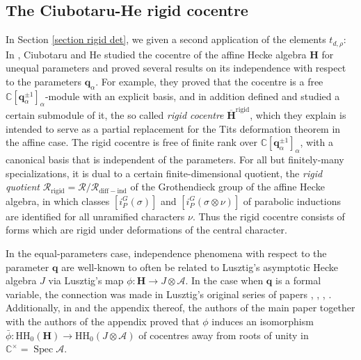 \documentclass[10pt]{article}
\DeclareMathOperator{\Spec}{Spec}
\newcommand{\HH}{\mathbf{H}}
\newcommand{\trace}[2]{\mathrm{trace}\left({#1}\,,{#2}\right)}
\newcommand{\C}{\mathbb{C}}
\newcommand{\bq}{\mathbf{q}}
\theoremstyle{definition}
\theoremstyle{remark}
\newcommand{\Hr}{\overline{\HH}^{\mathrm{rigid}}}
\newcommand{\Hrq}{\overline{H}^{\mathrm{rigid}}_q}
\newcommand{\phir}{\overline{\phi}^{\mathrm{rigid}}}
\newcommand{\Jr}{\overline{J}^{\mathrm{rigid}}}
\newcommand{\Jrs}{\overline{J}^{\mathrm{rigid}}_{\mathrm{sub}}}
\newcommand{\RH}{\mathcal{R}}
\newcommand{\RHr}{\mathcal{R}_{\mathrm{rigid}}}
\newcommand{\RHdi}{\mathcal{R}_{\mathrm{diff-ind}}}
\newcommand{\hhh}{\mathrm{HH}_0}
\begin{document}
\subsection{The Ciubotaru-He rigid cocentre}
In Section \ref{section rigid det}, we given a second application of the elements $t_{d,\rho}$:
In \cite{CH}, Ciubotaru and He studied the cocentre of the affine Hecke algebra $\HH$
for unequal parameters and proved several results on its independence with respect to the parameters 
$\bq_\alpha$. 
For example, they proved that the cocentre is a free $\C[\bq_\alpha^{\pm 1}]_\alpha$-module with an 
explicit basis, and in addition defined and studied a certain submodule of it, the so called 
\emph{rigid cocentre} $\Hr$, which they explain is intended to serve as a partial replacement for the Tits 
deformation theorem in the affine case. The rigid cocentre is free of finite rank over $\C[\bq_\alpha^{\pm 1}]_\alpha$, 
with a canonical basis that is independent of the parameters. For all but finitely-many specializations, 
it is dual to a certain finite-dimensional quotient, the \emph{rigid quotient} $\RHr=\RH/\RHdi$ of the Grothendieck 
group of the affine Hecke algebra, in which classes $[i_P^G(\sigma)]$ and 
$[i_P^G(\sigma\otimes\nu)]$ of parabolic inductions are identified for all unramified characters $\nu$. 
Thus the rigid cocentre consists of forms which are rigid under deformations of the central character. 

In the equal-parameters case, independence phenomena with respect to the parameter $\bq$ are
well-known to often be related to Lusztig's asymptotic Hecke algebra $J$ via Lusztig's map $\phi\colon\HH\to J\otimes\mathcal{A}$.
In the case when $\bq$ is a formal variable, the connection was made in Lusztig's original series 
of papers \cite{cellsI}, \cite{cellsII}, \cite{cellsIII}, \cite{cellsIV}.
Additionally, in \cite{BDD} and 
the appendix thereof, the authors of the main paper together with the authors 
of the appendix proved  that $\phi$ induces 
an isomorphism $\bar{\phi}\colon\hhh(\HH)\to\hhh(J\otimes\mathcal{A})$ of cocentres away from roots of unity
in $\C^\times=\Spec\mathcal{A}$.

\end{document}
